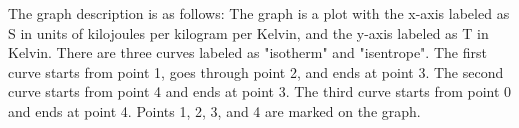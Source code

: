 The graph description is as follows: The graph is a plot with the x-axis labeled as S in units of kilojoules per kilogram per Kelvin, and the y-axis labeled as T in Kelvin. There are three curves labeled as "isotherm" and "isentrope". The first curve starts from point 1, goes through point 2, and ends at point 3. The second curve starts from point 4 and ends at point 3. The third curve starts from point 0 and ends at point 4. Points 1, 2, 3, and 4 are marked on the graph.